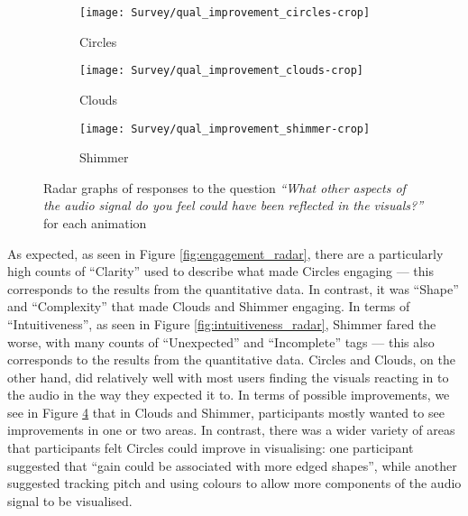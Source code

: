 \documentclass[../initial_thesis.tex]{subfiles}
\begin{document}
\begin{figure}
  \begin{subfigure}{0.32\textwidth}
    \centering
    \texttt{[image: Survey/qual\_improvement\_circles-crop]}
    \caption{Circles}
    \label{fig:improvement_circles}
  \end{subfigure}
  \begin{subfigure}{0.32\textwidth}
    \centering
    \texttt{[image: Survey/qual\_improvement\_clouds-crop]}
    \caption{Clouds}
    \label{fig:improvement_clouds}
  \end{subfigure}
  \begin{subfigure}{0.32\textwidth}
    \centering
    \texttt{[image: Survey/qual\_improvement\_shimmer-crop]}
    \caption{Shimmer}
    \label{fig:improvement_shimmer}
  \end{subfigure}
  \caption{Radar graphs of responses to the question \textit{``What other aspects of the audio signal do you feel could have been reflected in the visuals?''} for each animation}
  \label{fig:improvement_radar}
\end{figure}

As expected, as seen in Figure \ref{fig:engagement_radar}, there are a particularly high counts of ``Clarity'' used to describe what made Circles engaging --- this corresponds to the results from the quantitative data. In contrast, it was ``Shape'' and ``Complexity'' that made Clouds and Shimmer engaging. In terms of ``Intuitiveness'', as seen in Figure \ref{fig:intuitiveness_radar}, Shimmer fared the worse, with many counts of ``Unexpected'' and ``Incomplete'' tags --- this also corresponds to the results from the quantitative data. Circles and Clouds, on the other hand, did relatively well with most users finding the visuals reacting in to the audio in the way they expected it to. In terms of possible improvements, we see in Figure \ref{fig:improvement_radar} that in Clouds and Shimmer, participants mostly wanted to see improvements in one or two areas. In contrast, there was a wider variety of areas that participants felt Circles could improve in visualising: one participant suggested that ``gain could be associated with more edged shapes'', while another suggested tracking pitch and using colours to allow more components of the audio signal to be visualised.
\end{document}
